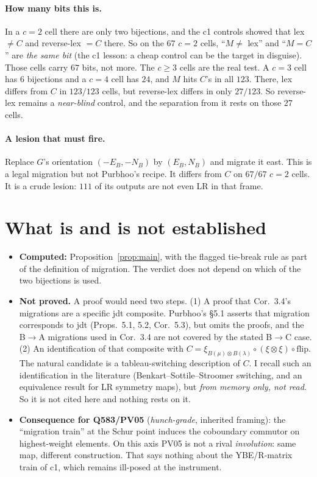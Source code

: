 \documentclass[11pt]{article}
\theoremstyle{definition}
\begin{document}
\paragraph{How many bits this is.} In a $c=2$ cell there are only two bijections, and the c1 controls showed that
lex $\neq C$ and reverse-lex $=C$ there. So on the $67$ $c=2$ cells, ``$M\ne$ lex'' and ``$M=C$'' are \emph{the same
bit} (the c1 lesson: a cheap control can be the target in disguise). Those cells carry $67$ bits, not more. The $c\ge3$
cells are the real test. A $c=3$ cell has $6$ bijections and a $c=4$ cell has $24$, and $M$ hits $C$'s in all $123$.
There, lex differs from $C$ in $123/123$ cells, but reverse-lex differs in only $27/123$. So reverse-lex remains a
\emph{near-blind} control, and the separation from it rests on those $27$ cells.

\paragraph{A lesion that must fire.} Replace $G$'s orientation $(-E_B,-N_B)$ by $(E_B,N_B)$ and migrate it east. This
is a legal migration but not Purbhoo's recipe. It differs from $C$ on $67/67$ $c=2$ cells. It is a crude lesion: $111$
of its outputs are not even LR in that frame.

\section{What is and is not established}
\begin{itemize}
\item \textbf{Computed:} Proposition~\ref{prop:main}, with the flagged tie-break rule as part of the definition of
migration. The verdict does not depend on which of the two bijections is used.
\item \textbf{Not proved.} A proof would need two steps. (1) A proof that Cor.~3.4's migrations are a specific jdt
composite. Purbhoo's \S5.1 asserts that migration corresponds to jdt (Props.~5.1, 5.2, Cor.~5.3), but omits the proofs,
and the B$\to$A migrations used in Cor.~3.4 are not covered by the stated B$\to$C case. (2) An identification of that
composite with $C=\xi_{B(\mu)\otimes B(\lambda)}\circ(\xi\otimes\xi)\circ\mathrm{flip}$. The natural candidate is a
tableau-switching description of $C$. I recall such an identification in the literature (Benkart--Sottile--Stroomer
switching, and an equivalence result for LR symmetry maps), but \emph{from memory only, not read}. So it is not cited
here and nothing rests on it.
\item \textbf{Consequence for Q583/PV05} (\emph{hunch-grade}, inherited framing): the ``migration train'' at the Schur
point induces the coboundary commutor on highest-weight elements. On this axis PV05 is not a rival \emph{involution}:
same map, different construction. That says nothing about the YBE/R-matrix train of c1, which remains ill-posed at the
instrument.
\end{itemize}
\end{document}
